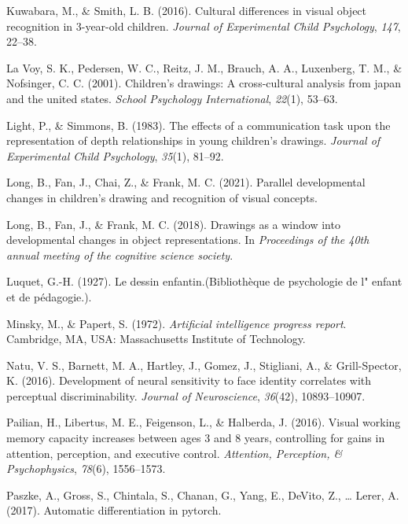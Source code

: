 \documentclass[
  english,
  man]{apa6}
\begin{document}
\leavevmode\hypertarget{ref-kuwabara2016cultural}{}%
Kuwabara, M., \& Smith, L. B. (2016). Cultural differences in visual object recognition in 3-year-old children. \emph{Journal of Experimental Child Psychology}, \emph{147}, 22--38.

\leavevmode\hypertarget{ref-la2001children}{}%
La Voy, S. K., Pedersen, W. C., Reitz, J. M., Brauch, A. A., Luxenberg, T. M., \& Nofsinger, C. C. (2001). Children's drawings: A cross-cultural analysis from japan and the united states. \emph{School Psychology International}, \emph{22}(1), 53--63.

\leavevmode\hypertarget{ref-light1983effects}{}%
Light, P., \& Simmons, B. (1983). The effects of a communication task upon the representation of depth relationships in young children's drawings. \emph{Journal of Experimental Child Psychology}, \emph{35}(1), 81--92.

\leavevmode\hypertarget{ref-long2021parallel}{}%
Long, B., Fan, J., Chai, Z., \& Frank, M. C. (2021). Parallel developmental changes in children's drawing and recognition of visual concepts.

\leavevmode\hypertarget{ref-long2018drawings}{}%
Long, B., Fan, J., \& Frank, M. C. (2018). Drawings as a window into developmental changes in object representations. In \emph{Proceedings of the 40th annual meeting of the cognitive science society}.

\leavevmode\hypertarget{ref-luquet1927dessin}{}%
Luquet, G.-H. (1927). Le dessin enfantin.(Bibliothèque de psychologie de l" enfant et de pédagogie.).

\leavevmode\hypertarget{ref-minsky1972artificial}{}%
Minsky, M., \& Papert, S. (1972). \emph{Artificial intelligence progress report}. Cambridge, MA, USA: Massachusetts Institute of Technology.

\leavevmode\hypertarget{ref-natu2016development}{}%
Natu, V. S., Barnett, M. A., Hartley, J., Gomez, J., Stigliani, A., \& Grill-Spector, K. (2016). Development of neural sensitivity to face identity correlates with perceptual discriminability. \emph{Journal of Neuroscience}, \emph{36}(42), 10893--10907.

\leavevmode\hypertarget{ref-pailian2016visual}{}%
Pailian, H., Libertus, M. E., Feigenson, L., \& Halberda, J. (2016). Visual working memory capacity increases between ages 3 and 8 years, controlling for gains in attention, perception, and executive control. \emph{Attention, Perception, \& Psychophysics}, \emph{78}(6), 1556--1573.

\leavevmode\hypertarget{ref-paszke2017automatic}{}%
Paszke, A., Gross, S., Chintala, S., Chanan, G., Yang, E., DeVito, Z., \ldots{} Lerer, A. (2017). Automatic differentiation in pytorch.
\end{document}
